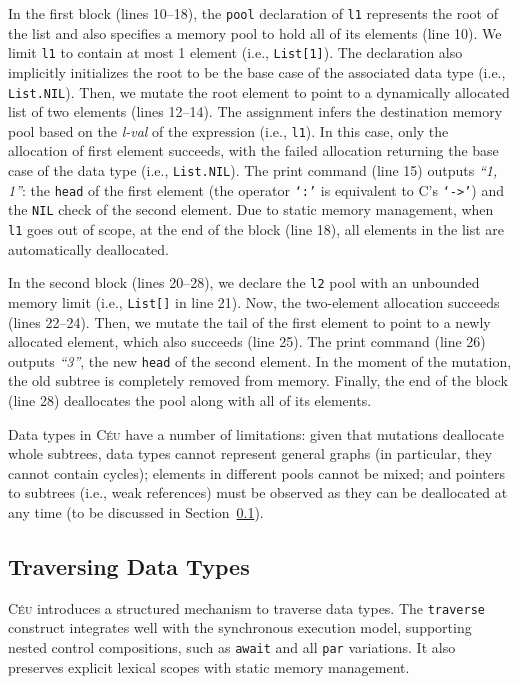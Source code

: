 \documentclass{acm_proc_article-sp}
\newcommand{\CEU}{\textsc{C\'{e}u}\xspace}
\newcommand{\code}[1] {{\small{\texttt{#1}}}}
\begin{document}
In the first block (lines 10--18), the \code{pool} declaration of \code{l1} 
represents the root of the list and also specifies a memory pool to hold all of 
its elements (line 10).
We limit \code{l1} to contain at most 1 element (i.e., \code{List[1]}).
The declaration also implicitly initializes the root to be the base case of the 
associated data type (i.e., \code{List.NIL}).
Then, we mutate the root element to point to a dynamically allocated list of 
two elements (lines 12--14).
The assignment infers the destination memory pool based on the \emph{l-val} of 
the expression (i.e., \code{l1}).
In this case, only the allocation of first element succeeds, with the failed 
allocation returning the base case of the data type (i.e., \code{List.NIL}).
The print command (line 15) outputs \emph{``1, 1''}: the \code{head} of the 
first element (the operator \code{`:'} is equivalent to C's \code{`->'}) and 
the \code{NIL} check of the second element.
Due to static memory management, when \code{l1} goes out of scope, at the end 
of the block (line 18), all elements in the list are automatically deallocated.

In the second block (lines 20--28), we declare the \code{l2} pool with an
unbounded memory limit (i.e., \code{List[]} in line 21).
Now, the two-element allocation succeeds (lines 22--24).
Then, we mutate the tail of the first element to point to a newly allocated 
element, which also succeeds (line 25).
The print command (line 26) outputs \emph{``3''}, the new \code{head} of the 
second element.
In the moment of the mutation, the old subtree is completely removed from 
memory.
Finally, the end of the block (line 28) deallocates the pool along with all of 
its elements.


Data types in \CEU have a number of limitations:
given that mutations deallocate whole subtrees, data types cannot represent 
general graphs (in particular, they cannot contain cycles);
elements in different pools cannot be mixed;
and pointers to subtrees (i.e., weak references) must be observed as they can 
be deallocated at any time (to be discussed in Section~\ref{sec.traverse}).

\subsection{Traversing Data Types}
\label{sec.traverse}

\CEU introduces a structured mechanism to traverse data types.
The \code{traverse} construct integrates well with the synchronous execution 
model, supporting nested control compositions, such as \code{await} and all 
\code{par} variations.
It also preserves explicit lexical scopes with static memory management.
\end{document}
